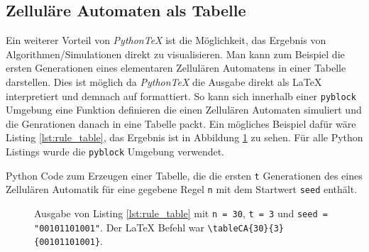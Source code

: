 \documentclass[11pt,a4paper]{article}
\newcommand{\tableCA}[3]{\py{rule(#1, #2, "#3")}}
\newcommand{\pythontex}{\textit{Python\TeX{}}}
\begin{document}
\subsection{Zelluläre Automaten als Tabelle}
Ein weiterer Vorteil von \pythontex{} ist die Möglichkeit, das Ergebnis von Algorithmen/Simulationen direkt zu visualisieren.
%
Man kann zum Beispiel die ersten Generationen eines elementaren Zellulären Automatens in einer Tabelle darstellen.
%
Dies ist möglich da \pythontex{} die Ausgabe direkt als \LaTeX{} interpretiert und demnach auf formattiert.
%
So kann sich innerhalb einer \texttt{pyblock} Umgebung eine Funktion definieren die einen Zellulären Automaten simuliert und die Genrationen danach in eine Tabelle packt.
%
Ein mögliches Beispiel dafür wäre Listing \ref{lst:rule_table}, das Ergebnis ist in Abbildung \ref{fig:rule_30_table} zu sehen.
%
Für alle Python Listings wurde die \texttt{pyblock} Umgebung verwendet.
%
\begin{listing}
  \centering
  \caption{Python Code zum Erzeugen einer Tabelle, die die ersten \texttt{t} Generationen des eines Zellulären Automatik für eine gegebene Regel \texttt{n} mit dem Startwert \texttt{seed} enthält.}
  \label{lst:rule_table}
\end{listing}
%
\begin{figure}[H]
  \centering
  \tableCA{30}{3}{00101101001}
  \caption{Ausgabe von Listing \ref{lst:rule_table} mit \texttt{n = 30}, \texttt{t = 3} und \texttt{seed = "00101101001"}. Der \LaTeX{} Befehl war \texttt{\textbackslash tableCA\{30\}\{3\}\{00101101001\}}.}
  \label{fig:rule_30_table}
\end{figure}
\end{document}
